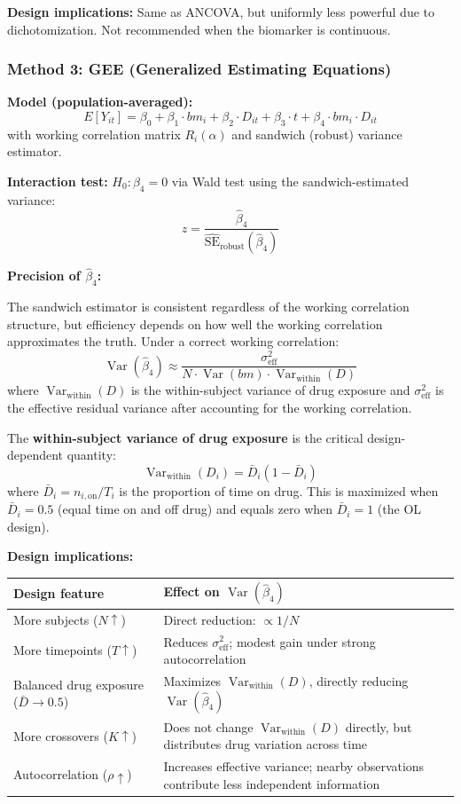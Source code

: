 \documentclass[11pt,letterpaper]{article}
\begin{document}
\textbf{Design implications:} Same as ANCOVA, but uniformly less
powerful due to dichotomization. Not recommended when the biomarker is
continuous.

\subsubsection{Method 3: GEE (Generalized Estimating Equations)}

\textbf{Model (population-averaged):}
\[
E[Y_{it}] = \beta_0 + \beta_1 \cdot bm_i + \beta_2 \cdot D_{it}
+ \beta_3 \cdot t + \beta_4 \cdot bm_i \cdot D_{it}
\]
with working correlation matrix $R_i(\alpha)$ and sandwich (robust)
variance estimator.

\textbf{Interaction test:} $H_0: \beta_4 = 0$ via Wald test using the
sandwich-estimated variance:
\[
z = \frac{\hat{\beta}_4}{\widehat{\text{SE}}_{\text{robust}}
(\hat{\beta}_4)}
\]

\textbf{Precision of $\hat{\beta}_4$:}

The sandwich estimator is consistent regardless of the working
correlation structure, but efficiency depends on how well the working
correlation approximates the truth. Under a correct working correlation:
\[
\operatorname{Var}(\hat{\beta}_4) \approx
\frac{\sigma^2_{\text{eff}}}{N \cdot \operatorname{Var}(bm) \cdot
\operatorname{Var}_{\text{within}}(D)}
\]
where $\operatorname{Var}_{\text{within}}(D)$ is the within-subject
variance of drug exposure and $\sigma^2_{\text{eff}}$ is the effective
residual variance after accounting for the working correlation.

The \textbf{within-subject variance of drug exposure} is the critical
design-dependent quantity:
\[
\operatorname{Var}_{\text{within}}(D_i) = \bar{D}_i(1 - \bar{D}_i)
\]
where $\bar{D}_i = n_{i,\text{on}} / T_i$ is the proportion of time on
drug. This is maximized when $\bar{D}_i = 0.5$ (equal time on and off
drug) and equals zero when $\bar{D}_i = 1$ (the OL design).

\textbf{Design implications:}

\begin{table}[h]
\centering\small
\begin{tabular}{@{}L{5cm}L{8.5cm}@{}}
\toprule
Design feature & Effect on $\operatorname{Var}(\hat{\beta}_4)$ \\
\midrule
More subjects ($N \uparrow$) & Direct reduction: $\propto 1/N$ \\
More timepoints ($T \uparrow$) & Reduces $\sigma^2_{\text{eff}}$; modest gain under strong autocorrelation \\
Balanced drug exposure ($\bar{D} \to 0.5$) & Maximizes $\operatorname{Var}_{\text{within}}(D)$, directly reducing $\operatorname{Var}(\hat{\beta}_4)$ \\
More crossovers ($K \uparrow$) & Does not change $\operatorname{Var}_{\text{within}}(D)$ directly, but distributes drug variation across time \\
Autocorrelation ($\rho \uparrow$) & Increases effective variance; nearby observations contribute less independent information \\
\bottomrule
\end{tabular}
\end{table}
\end{document}
